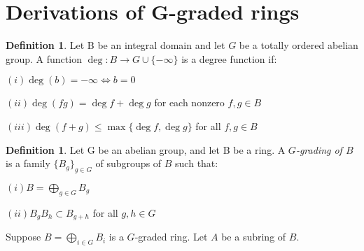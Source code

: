 \documentclass[12pt]{amsart}
\theoremstyle{plain}
\theoremstyle{definition}
\newtheorem{definition}[subsection]{Definition}
\begin{document}
\section{Derivations of G-graded rings}

\begin{definition} Let B be an integral domain and let $G$ be a totally ordered abelian group. A function $\deg : B \to G \cup \{-\infty\}$  is a degree function if:

$(i) \deg(b) = -\infty \iff b = 0$

$(ii) \deg(fg) = \deg f + \deg g$ for each nonzero $f,g \in B$

$(iii) \deg(f + g) \leq \max\{\deg f, \deg g\}$ for all $f,g \in B$
\end{definition}

\begin{definition}
Let G be an abelian group, and let B be a ring. A \textit{$G$-grading of $B$} is a family $\{B_g\}_{g \in G}$ of subgroups of $B$ such that:

$(i) B = \bigoplus\limits_{g \in G} B_g$

$(ii) B_g B_h \subset B_{g+h}$ for all $g, h \in G$

\end{definition}

Suppose $B = \bigoplus\limits_{i \in G} B_i$ is a $G$-graded ring. Let $A$ be a subring of $B$.  
\end{document}

